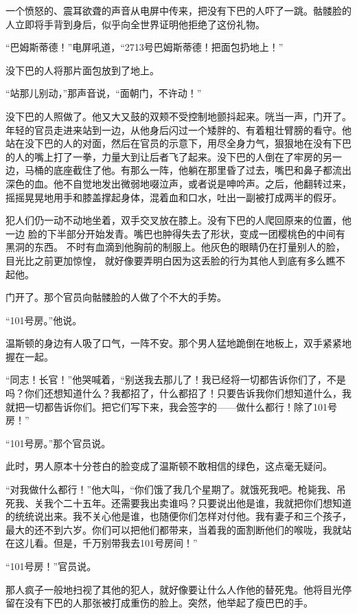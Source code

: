 一个愤怒的、震耳欲聋的声音从电屏中传来，把没有下巴的人吓了一跳。骷髅脸的人立即将手背到身后，似乎向全世界证明他拒绝了这份礼物。

``巴姆斯蒂德！''电屏吼道，``2713号巴姆斯蒂德！把面包扔地上！''

没下巴的人将那片面包放到了地上。

``站那儿别动，''那声音说，``面朝门，不许动！''

没下巴的人照做了。他又大又鼓的双颊不受控制地颤抖起来。咣当一声，门开了。年轻的官员走进来站到一边，从他身后闪过一个矮胖的、有着粗壮臂膀的看守。他站在没下巴的人的对面，然后在官员的示意下，用尽全身力气，狠狠地在没有下巴的人的嘴上打了一拳，力量大到让后者飞了起来。没下巴的人倒在了牢房的另一边，马桶的底座截住了他。有那么一阵，他躺在那里昏了过去，嘴巴和鼻子都流出深色的血。他不自觉地发出微弱地啜泣声，或者说是呻吟声。之后，他翻转过来，摇摇晃晃地用手和膝盖撑起身体，混着血和口水，吐出一副被打成两半的假牙。

犯人们仍一动不动地坐着，双手交叉放在膝上。没有下巴的人爬回原来的位置，他一边
脸的下半部分开始发青。嘴巴也肿得失去了形状，变成一团樱桃色的中间有黑洞的东西。
不时有血滴到他胸前的制服上。他灰色的眼睛仍在打量别人的脸，目光比之前更加惊惶，
就好像要弄明白因为这丢脸的行为其他人到底有多么瞧不起他。

门开了。那个官员向骷髅脸的人做了个不大的手势。

``101号房。''他说。

温斯顿的身边有人吸了口气，一阵不安。那个男人猛地跪倒在地板上，双手紧紧地握在一起。

``同志！长官！''他哭喊着，``别送我去那儿了！我已经将一切都告诉你们了，不是吗？你们还想知道什么？我都招了，什么都招了！只要告诉我你们想知道什么，我就把一切都告诉你们。把它们写下来，我会签字的——做什么都行！除了101号房！''

``101号房。''那个官员说。

此时，男人原本十分苍白的脸变成了温斯顿不敢相信的绿色，这点毫无疑问。

``对我做什么都行！''他大叫，``你们饿了我几个星期了。就饿死我吧。枪毙我、吊死我、关我个二十五年。还需要我出卖谁吗？只要说出他是谁，我就把你们想知道的统统说出来。我不关心他是谁，也随便你们怎样对付他。我有妻子和三个孩子，最大的还不到六岁。你们可以把他们都带来，当着我的面割断他们的喉咙，我就站在这儿看。但是，千万别带我去101号房间！''

``101号房！''官员说。

那人疯子一般地扫视了其他的犯人，就好像要让什么人作他的替死鬼。他将目光停留在没有下巴的人那张被打成重伤的脸上。突然，他举起了瘦巴巴的手。

